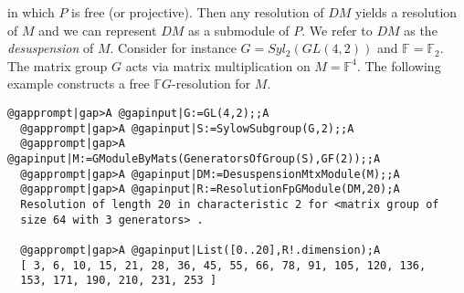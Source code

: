 \documentclass[a4paper,11pt]{report}
\begin{document}
{{ in which $P$ is free (or projective). Then any resolution of $DM$ yields a resolution of $M$ and we can represent $DM$ as a submodule of $P$. We refer to $DM$ as the \emph{desuspension} of $M$. Consider for instance $G=Syl_2(GL(4,2))$ and $\mathbb F=\mathbb F_2$. The matrix group $G$ acts via matrix multiplication on $M=\mathbb F^4$. The following example constructs a free $\mathbb FG$-resolution for $M$. 
\begin{Verbatim}[commandchars=@|A,fontsize=\small,frame=single,label=Example]
  @gapprompt|gap>A @gapinput|G:=GL(4,2);;A
  @gapprompt|gap>A @gapinput|S:=SylowSubgroup(G,2);;A
  @gapprompt|gap>A @gapinput|M:=GModuleByMats(GeneratorsOfGroup(S),GF(2));;A
  @gapprompt|gap>A @gapinput|DM:=DesuspensionMtxModule(M);;A
  @gapprompt|gap>A @gapinput|R:=ResolutionFpGModule(DM,20);A
  Resolution of length 20 in characteristic 2 for <matrix group of 
  size 64 with 3 generators> .
  
  @gapprompt|gap>A @gapinput|List([0..20],R!.dimension);A
  [ 3, 6, 10, 15, 21, 28, 36, 45, 55, 66, 78, 91, 105, 120, 136, 
  153, 171, 190, 210, 231, 253 ]
  
\end{Verbatim}
 }

 }

 
\end{document}
